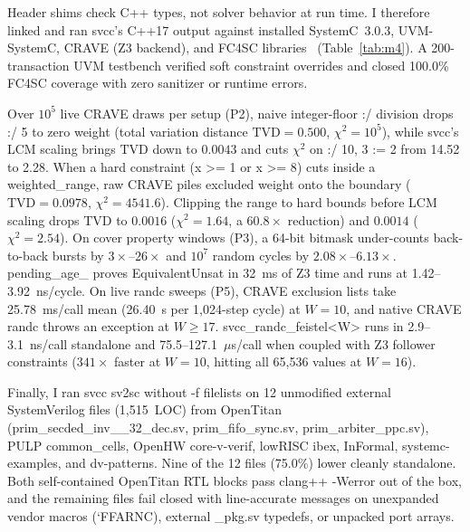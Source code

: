 \documentclass[conference]{IEEEtran}
\newcommand{\code}[1]{{\fontshape{n}\ttfamily #1}}
\begin{document}
Header shims check C++ types, not solver behavior at run time. I therefore linked and ran \code{svcc}'s C++17 output against installed SystemC~3.0.3, UVM-SystemC, CRAVE (Z3 backend), and FC4SC libraries~\cite{accellera2026systemc,kubavat2026scbench} (Table~\ref{tab:m4}). A 200-transaction UVM testbench verified \code{soft} constraint overrides and closed 100.0\% FC4SC coverage with zero sanitizer or runtime errors.

Over $10^5$ live CRAVE draws per setup (\code{P2}), naive integer-floor \code{:/} division drops \code{[0:15] :/ 5} to zero weight (total variation distance $\text{TVD} = 0.500$, $\chi^2 = 10^5$), while \code{svcc}'s LCM scaling brings $\text{TVD}$ down to $0.0043$ and cuts $\chi^2$ on \code{[0:2] :/ 10, 3 := 2} from 14.52 to 2.28. When a hard constraint (\code{x >= 1} or \code{x >= 8}) cuts inside a \code{weighted\_range}, raw CRAVE piles excluded weight onto the boundary ($\text{TVD} = 0.0978$, $\chi^2 = 4541.6$). Clipping the range to hard bounds before LCM scaling drops $\text{TVD}$ to $0.0016$ ($\chi^2 = 1.64$, a $60.8\times$ reduction) and $0.0014$ ($\chi^2 = 2.54$). On \code{cover property} windows (\code{P3}), a 64-bit bitmask under-counts back-to-back bursts by $3\times$--$26\times$ and $10^7$ random cycles by $2.08\times$--$6.13\times$. \code{pending\_age\_} proves \code{EquivalentUnsat} in 32~ms of Z3 time and runs at 1.42--3.92~ns/cycle. On live \code{randc} sweeps (\code{P5}), CRAVE exclusion lists take 25.78~ms/call mean (26.40~s per 1,024-step cycle) at $W=10$, and native CRAVE \code{randc} throws an exception at $W \ge 17$. \code{svcc\_\allowbreak randc\_\allowbreak feistel<W>} runs in 2.9--3.1~ns/call standalone and 75.5--127.1~$\mu$s/call when coupled with Z3 follower constraints ($341\times$ faster at $W=10$, hitting all 65,536 values at $W=16$).

Finally, I ran \code{svcc sv2sc} without \code{-f} filelists on 12 unmodified external SystemVerilog files (1,515~LOC) from OpenTitan (\code{prim\_\allowbreak secded\_\allowbreak inv\_\_32\_dec.sv}, \code{prim\_\allowbreak fifo\_\allowbreak sync.sv}, \code{prim\_\allowbreak arbiter\_\allowbreak ppc.sv}), PULP \code{common\_\allowbreak cells}, OpenHW \code{core-v-verif}, lowRISC \code{ibex}, \code{InFormal}, \code{systemc-\allowbreak examples}, and \code{dv-\allowbreak patterns}. Nine of the 12 files (75.0\%) lower cleanly standalone. Both self-contained OpenTitan RTL blocks pass \code{clang++ -Werror} out of the box, and the remaining files fail closed with line-accurate messages on unexpanded vendor macros (\code{`FFARNC}), external \code{*\_pkg.sv} typedefs, or unpacked port arrays.
\end{document}
